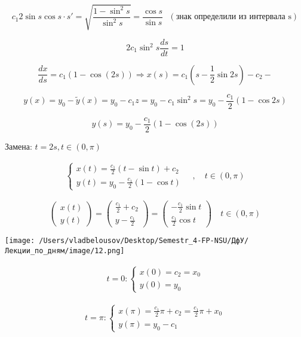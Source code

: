 \documentclass[12pt, a4paper]{report}
\begin{document}
\[ c_1 2 \sin s \cos s \cdot s' = \sqrt{ \frac{1- \sin ^2 s }{\sin ^2 s } }= \frac{\cos s }{\sin s } \text{ } (\text{знак определили из интервала s} )   \] 

\[ 2 c_1 \sin ^2 s \frac{ds}{dt } =1     \] 

\[ \frac{dx }{ds }  = c_1 ( 1 - \cos (2s) ) \Rightarrow \boxed{x(s) = c_1 \left( s - \frac{1}{2 }  \sin 2s  \right)- c_2} -   \] 

\[ y(x )= y_0 - \tilde{y } (x ) = y_0 - c_1z= y_0 - c_1 \sin ^2 s = y_0 - \frac{c_1}{2} ( 1 - \cos  2s) \]  

\[ \boxed{y(s )= y_0 - \frac{c_1}{2 }  ( 1 - \cos (2s))}   \] 

Замена: \( t = 2s , \text{}  t \in  ( 0 , \pi) \) 

\[ \begin{aligned}
    \begin{cases}
        \displaystyle x(t) = \frac{c_1}{ 2 }  ( t - \sin t ) + c_2  \\ 
        \displaystyle y(t)= y_0 - \frac{c_1}{2 }  ( 1 - \cos t)
    \end{cases}
    \quad , \quad t \in ( 0 , \pi)
\end{aligned} \]

\[ \begin{pmatrix}
x(t )\\
y (t)
\end{pmatrix} = \begin{pmatrix}
\frac{c_1}{2 }  + c_2 \\
y - \frac{c_1}{2} 
\end{pmatrix}= \begin{pmatrix}
-\frac{c_1}{2 } \sin t\\
\frac{c_1}{2}  \cos t 
\end{pmatrix} \quad t \in  (0 , \pi)\] 

\begin{center}
    \texttt{[image: /Users/vladbelousov/Desktop/Semestr\_4-FP-NSU/ДфУ/Лекции\_по\_дням/image/12.png]}
\end{center}

\[ \begin{aligned}
    t= 0 : 
    \begin{cases}
        x(0 ) = c_2 = x_0 \\
        y(0 ) = y_0
    \end{cases}
\end{aligned} \] 

\[ \begin{aligned}
    t= \pi: 
    \begin{cases}
        x(\pi ) = \frac{c_1}{2 }  \pi + c_2= \frac{c_1}{2 } \pi + x_0  \\
        y(\pi) = y_0 - c_1
    \end{cases}
\end{aligned} \] 
\end{document}
